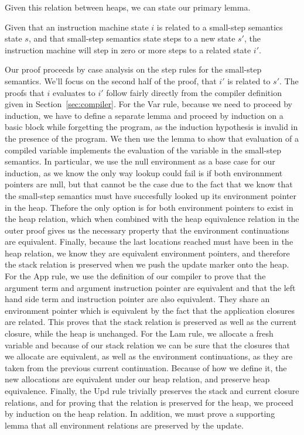 Given this relation between heaps, we can state our primary lemma.
\begin{lemma} \label{lem:cesm_im}
Given that an instruction machine state $i$ is related to a small-step
semantics state $s$, and that small-step semantics state steps to a new state
$s'$, the instruction machine will step in zero or more steps to a related state
$i'$.
\end{lemma}
\begin{proofoutline}
Our proof proceeds by case analysis on the step rules for the small-step
semantics. We'll focus on the second half of the proof, that $i'$ is related to
$s'$. The proofs that $i$ evaluates to $i'$ follow fairly directly from the
compiler definition given in Section~\ref{sec:compiler}. For the Var rule,
because we need to proceed by induction, we have to define a separate lemma and
proceed by induction on a basic block while forgetting the program, as the
induction hypothesis is invalid in the presence of the program. We then use the
lemma to show that evaluation of a compiled variable implements the evaluation
of the variable in the small-step semantics. In particular, we use the null
environment as a base case for our induction, as we know the only way lookup
could fail is if both environnment pointers are null, but that cannot be the
case due to the fact that we know that the small-step semantics must have
succesfully looked up its environment pointer in the heap. Thefore the only
option is for both environment pointers to exist in the heap relation, which
when combined with the heap equivalence relation in the outer proof gives us the
necessary property that the environment continuations are equivalent. Finally,
because the last locations reached must have been in the heap relation, we know
they are equivalent environment pointers, and therefore the stack relation is
preserved when we push the update marker onto the heap. For the App rule, we use
the definition of our compiler to prove that the argument term and argument
instruction pointer are equivalent and that the left hand side term and
instruction pointer are also equivalent. They share an environment pointer which
is equivalent by the fact that the application closures are related.  This
proves that the stack relation is preserved as well as the current closure,
while the heap is unchanged. For the Lam rule, we allocate a fresh variable and
because of our stack relation we can be sure that the closures that we
allocate are equivalent, as well as the environment continuations, as they are
taken from the previous current continuation. Because of how we define it, the
new allocations are equivalent under our heap relation, and preserve heap
equivalence. Finally, the Upd rule trivially preserves the stack and current
closure relations, and for proving that the relation is preserved for the
heap, we proceed by induction on the heap relation. In addition, we must prove
a supporting lemma that all environment relations are preserved by the update.
\end{proofoutline}

